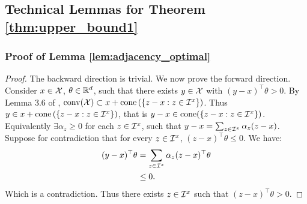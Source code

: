 \subsection{Technical Lemmas for Theorem \ref{thm:upper_bound1}}

\subsubsection{Proof of Lemma \ref{lem:adjacency_optimal}}
\begin{proof}
    The backward direction is trivial. We now prove the forward direction. Consider $x \in \mathcal{X}$, $\theta \in \mathbb{R}^d$, such that there exists $y \in \mathcal{X} $ with $(y-x)^\top \theta > 0$. By Lemma 3.6 of \cite{Ziegler1995}, $\operatorname*{conv}(\mathcal{X}) \subset x + \mathrm{cone}\left(\{z -x: z \in \mathcal{I}^x\}\right)$. Thus $y \in x + \mathrm{cone}\left(\{z -x: z \in \mathcal{I}^x\}\right)$, that is $y - x \in\mathrm{cone}(\{z -x: z \in \mathcal{I}^x\})$. Equivalently $\exists \alpha_z \geq 0$ for each $z \in \mathcal{I}^x$, such that $y-x = \sum_{z \in \mathcal{I}^x} \alpha_z (z-x)$. Suppose for contradiction that for every $z \in \mathcal{I}^x$, $(z-x)^\top\theta \leq  0$. We have: 
    \begin{align*}
        (y-x)^{\top}\theta &= \sum_{z \in \mathcal{I}^x} \alpha_z (z-x)^{\top}\theta \\
        &\leq  0. 
    \end{align*}
    Which is a contradiction. Thus there exists $z \in \mathcal{I}^x$ such that $(z-x)^\top \theta >0$. 
\end{proof}
